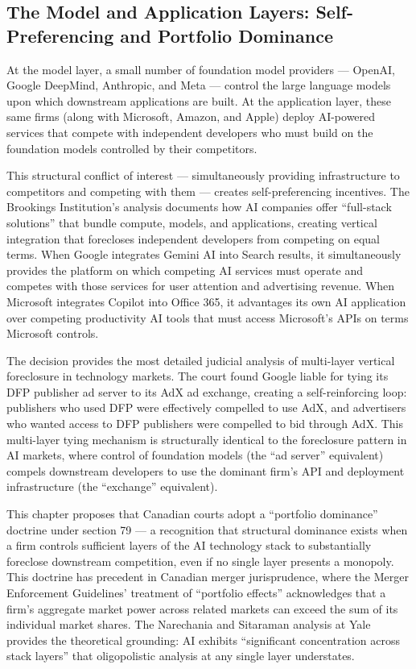 \subsection{The Model and Application Layers: Self-Preferencing and Portfolio Dominance}

At the model layer, a small number of foundation model providers --- OpenAI, Google DeepMind, Anthropic, and Meta --- control the large language models upon which downstream applications are built. At the application layer, these same firms (along with Microsoft, Amazon, and Apple) deploy AI-powered services that compete with independent developers who must build on the foundation models controlled by their competitors.

This structural conflict of interest --- simultaneously providing infrastructure to competitors and competing with them --- creates self-preferencing incentives. The Brookings Institution's analysis documents how AI companies offer ``full-stack solutions'' that bundle compute, models, and applications, creating vertical integration that forecloses independent developers from competing on equal terms. When Google integrates Gemini AI into Search results, it simultaneously provides the platform on which competing AI services must operate and competes with those services for user attention and advertising revenue. When Microsoft integrates Copilot into Office 365, it advantages its own AI application over competing productivity AI tools that must access Microsoft's APIs on terms Microsoft controls.

The  decision provides the most detailed judicial analysis of multi-layer vertical foreclosure in technology markets. The court found Google liable for tying its DFP publisher ad server to its AdX ad exchange, creating a self-reinforcing loop: publishers who used DFP were effectively compelled to use AdX, and advertisers who wanted access to DFP publishers were compelled to bid through AdX. This multi-layer tying mechanism is structurally identical to the foreclosure pattern in AI markets, where control of foundation models (the ``ad server'' equivalent) compels downstream developers to use the dominant firm's API and deployment infrastructure (the ``exchange'' equivalent).

This chapter proposes that Canadian courts adopt a ``portfolio dominance'' doctrine under section 79 --- a recognition that structural dominance exists when a firm controls sufficient layers of the AI technology stack to substantially foreclose downstream competition, even if no single layer presents a monopoly. This doctrine has precedent in Canadian merger jurisprudence, where the Merger Enforcement Guidelines' treatment of ``portfolio effects'' acknowledges that a firm's aggregate market power across related markets can exceed the sum of its individual market shares. The Narechania and Sitaraman analysis at Yale provides the theoretical grounding: AI exhibits ``significant concentration across stack layers'' that oligopolistic analysis at any single layer understates.


